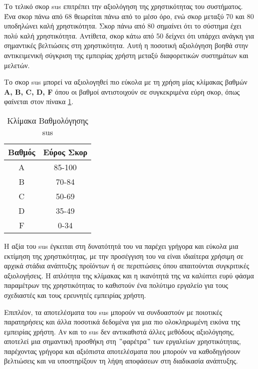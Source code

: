 Το τελικό σκορ \acrshort{sus} επιτρέπει την αξιολόγηση της χρηστικότητας του συστήματος. Ένα σκορ πάνω από 68 θεωρείται πάνω από το μέσο όρο, ενώ σκορ μεταξύ 70 και 80 υποδηλώνει καλή χρηστικότητα. Σκορ πάνω από 80 σημαίνει ότι το σύστημα έχει πολύ καλή χρηστικότητα. Αντίθετα, σκορ κάτω από 50 δείχνει ότι υπάρχει ανάγκη για σημαντικές βελτιώσεις στη χρηστικότητα. Αυτή η ποσοτική αξιολόγηση βοηθά στην αντικειμενική σύγκριση της εμπειρίας χρήστη μεταξύ διαφορετικών συστημάτων και μελετών\cite{noauthor_system_nodate}.

Το σκορ \acrshort{sus} μπορεί να αξιολογηθεί πιο εύκολα με τη χρήση μίας κλίμακας βαθμών \textbf{A, B, C, D, F} όπου οι βαθμοί αντιστοιχούν σε συγκεκριμένα εύρη σκορ, όπως φαίνεται στον πίνακα \ref{tab:sus_grades}\cite{bellio_sus_2023}.

\begin{table}[H]
    \centering
    \begin{tabular}{|c|c|}
        \hline
        \textbf{Βαθμός} & \textbf{Εύρος Σκορ} \\
        \hline
        A & 85-100 \\
        B & 70-84 \\
        C & 50-69 \\
        D & 35-49 \\
        F & 0-34 \\
        \hline
    \end{tabular}
    \caption{Κλίμακα Βαθμολόγησης \acrshort{sus}}
    \label{tab:sus_grades}
\end{table}

Η αξία του \acrshort{sus} έγκειται στη δυνατότητά του να παρέχει γρήγορα και εύκολα μια εκτίμηση της χρηστικότητας, με την προσέγγιση του να είναι ιδιαίτερα χρήσιμη σε αρχικά στάδια ανάπτυξης προϊόντων ή σε περιπτώσεις όπου απαιτούνται συγκριτικές αξιολογήσεις. Η απλότητα της κλίμακας και η ικανότητά της να καλύπτει ευρύ φάσμα παραμέτρων της χρηστικότητας το καθιστούν ένα πολύτιμο εργαλείο για τους σχεδιαστές και τους ερευνητές εμπειρίας χρήστη.

Επιπλέον, τα αποτελέσματα του \acrshort{sus} μπορούν να συνδυαστούν με ποιοτικές παρατηρήσεις και άλλα ποσοτικά δεδομένα για μια πιο ολοκληρωμένη εικόνα της εμπειρίας χρήστη. Αν και το \acrshort{sus} δεν αντικαθιστά άλλες μεθόδους αξιολόγησης, αποτελεί μια σημαντική προσθήκη στη \("\)φαρέτρα\("\) των εργαλείων χρηστικότητας, παρέχοντας γρήγορα και αξιόπιστα αποτελέσματα που μπορούν να καθοδηγήσουν βελτιώσεις και να υποστηρίξουν τη λήψη αποφάσεων στη διαδικασία ανάπτυξης.
